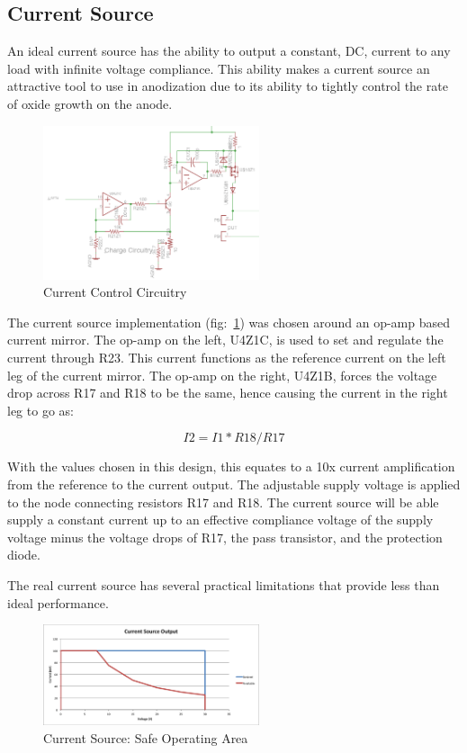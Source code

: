 \documentclass[journal]{IEEEtran}
\begin{document}
\subsection{Current Source}

An ideal current source has the ability to output a constant, DC, current to any load with infinite voltage compliance. This ability makes a current source an attractive tool to use in anodization due to its ability to tightly control the rate of oxide growth on the anode.

\begin{figure}[here]
\centering
\includegraphics[width=2.5in]{currentMirror}
\caption{Current Control Circuitry}
\label{fig:currentMirror}
\end{figure}


The current source implementation (fig:~\ref{fig:currentMirror}) was chosen around an op-amp based current mirror. The op-amp on the left, U4Z1C, is used to set and regulate the current through R23. This current functions as the reference current on the left leg of the current mirror. The op-amp on the right, U4Z1B, forces the voltage drop across R17 and R18 to be the same, hence causing the current in the right leg to go as:

\begin{equation}
I2 = I1*R18/R17
\end{equation}

With the values chosen in this design, this equates to a 10x current amplification from the reference to the current output. The adjustable supply voltage is applied to the node connecting resistors R17 and R18. The current source will be able supply a constant current up to an effective compliance voltage of the supply voltage minus the voltage drops of R17, the pass transistor, and the protection diode.

The real current source has several practical limitations that provide less than ideal performance. 

 
\begin{figure}[here]
\centering
\includegraphics[width=2.5in]{safeOpArea}
\caption{Current Source: Safe Operating Area}
\label{fig:safeOpArea}
\end{figure}
\end{document}
